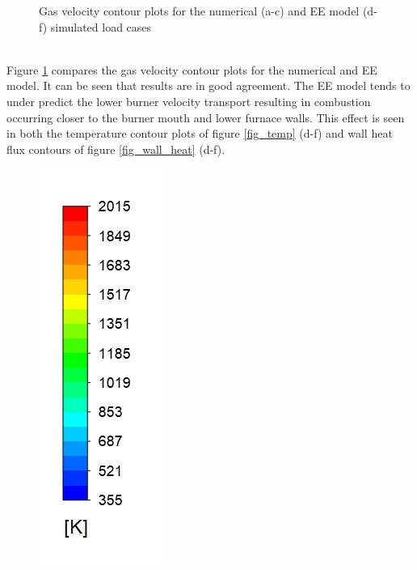 \documentclass{webofc}
\begin{document}
\begin{figure}[h!]
\setlength{\belowcaptionskip}{0pt}
\caption{Gas velocity contour plots for the numerical (a-c) and EE model (d-f) simulated load cases}
\label{fig_velocity}
\end{figure}\\

Figure \ref{fig_velocity} compares the gas velocity contour plots for the numerical and EE model. It can be seen that results are in good agreement. The EE model tends to under predict the lower burner velocity transport resulting in combustion occurring closer to the burner mouth and lower furnace walls. This effect is seen in both the temperature contour plots of figure \ref{fig_temp} (d-f) and wall heat flux contours of figure \ref{fig_wall_heat} (d-f).
\begin{figure}[h!]
\centering
\includegraphics[scale = 0.3]{temp} 

\end{figure}
\end{document}
